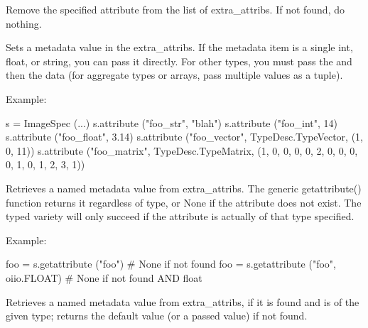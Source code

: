 Remove the specified attribute from the list of extra_attribs. If not found,
do nothing.
\apiend

Sets a metadata value in the {\cf extra_attribs}.  If the metadata item
is a single {\cf int}, {\cf float}, or {\cf string}, you can pass it
directly. For other types, you must pass the \TypeDesc and then the
data (for aggregate types or arrays, pass multiple values as a tuple).

\noindent Example:
\begin{code}
    s = ImageSpec (...)
    s.attribute ("foo_str", "blah")
    s.attribute ("foo_int", 14)
    s.attribute ("foo_float", 3.14)
    s.attribute ("foo_vector", TypeDesc.TypeVector, (1, 0, 11))
    s.attribute ("foo_matrix", TypeDesc.TypeMatrix,
                 (1, 0, 0, 0, 0, 2, 0, 0, 0, 0, 1, 0, 1, 2, 3, 1))
\end{code}
\apiend

Retrieves a named metadata value from {\cf extra_attribs}.  The generic
{\cf getattribute()} function returns it regardless of type, or {\cf None}
if the attribute does not exist.  The typed variety will only succeed
if the attribute is actually of that type specified.

\noindent Example:
\begin{code}
    foo = s.getattribute ("foo")   # None if not found
    foo = s.getattribute ("foo", oiio.FLOAT)  # None if not found AND float
\end{code}
\apiend

Retrieves a named metadata value from {\cf extra_attribs}, if it is
found and is of the given type; returns the default value (or a passed
value) if not found.

